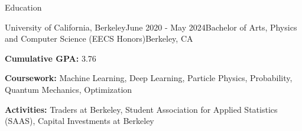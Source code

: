 \documentclass{resume} %
\begin{document}

\begin{rSection}{Education}
    \begin{rSubsection}{University of California, Berkeley}{June 2020 - May 2024}{Bachelor of Arts, Physics and Computer Science (EECS Honors)}{Berkeley, CA}
        \item {\bf Cumulative GPA:} 3.76
        \item {\bf Coursework:} Machine Learning, Deep Learning, Particle Physics, Probability, Quantum Mechanics, Optimization
        \item {\bf Activities:} Traders at Berkeley, Student Association for Applied Statistics (SAAS), Capital Investments at Berkeley
        \end{rSubsection}
    \end{rSection}

\end{document}
